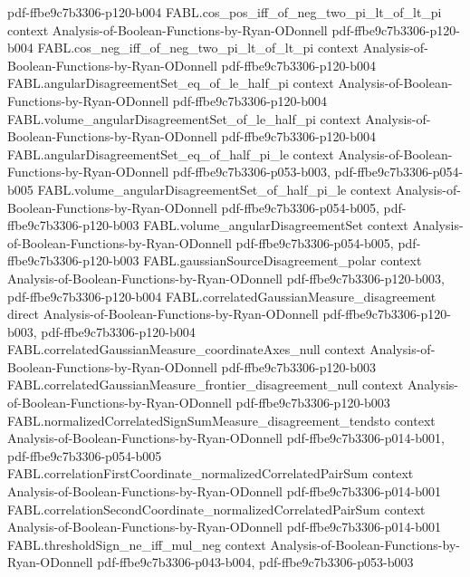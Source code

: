\begin{theorem}
  {pdf-ffbe9c7b3306-p120-b004}
\proofstep
  {FABL.cos_pos_iff_of_neg_two_pi_lt_of_lt_pi}
  {context}
  {Analysis-of-Boolean-Functions-by-Ryan-ODonnell}
  {pdf-ffbe9c7b3306-p120-b004}
\proofstep
  {FABL.cos_neg_iff_of_neg_two_pi_lt_of_lt_pi}
  {context}
  {Analysis-of-Boolean-Functions-by-Ryan-ODonnell}
  {pdf-ffbe9c7b3306-p120-b004}
\proofstep
  {FABL.angularDisagreementSet_eq_of_le_half_pi}
  {context}
  {Analysis-of-Boolean-Functions-by-Ryan-ODonnell}
  {pdf-ffbe9c7b3306-p120-b004}
\proofstep
  {FABL.volume_angularDisagreementSet_of_le_half_pi}
  {context}
  {Analysis-of-Boolean-Functions-by-Ryan-ODonnell}
  {pdf-ffbe9c7b3306-p120-b004}
\proofstep
  {FABL.angularDisagreementSet_eq_of_half_pi_le}
  {context}
  {Analysis-of-Boolean-Functions-by-Ryan-ODonnell}
  {pdf-ffbe9c7b3306-p053-b003,
    pdf-ffbe9c7b3306-p054-b005}
\proofstep
  {FABL.volume_angularDisagreementSet_of_half_pi_le}
  {context}
  {Analysis-of-Boolean-Functions-by-Ryan-ODonnell}
  {pdf-ffbe9c7b3306-p054-b005,
    pdf-ffbe9c7b3306-p120-b003}
\proofstep
  {FABL.volume_angularDisagreementSet}
  {context}
  {Analysis-of-Boolean-Functions-by-Ryan-ODonnell}
  {pdf-ffbe9c7b3306-p054-b005,
    pdf-ffbe9c7b3306-p120-b003}
\proofstep
  {FABL.gaussianSourceDisagreement_polar}
  {context}
  {Analysis-of-Boolean-Functions-by-Ryan-ODonnell}
  {pdf-ffbe9c7b3306-p120-b003,
    pdf-ffbe9c7b3306-p120-b004}
\proofstep
  {FABL.correlatedGaussianMeasure_disagreement}
  {direct}
  {Analysis-of-Boolean-Functions-by-Ryan-ODonnell}
  {pdf-ffbe9c7b3306-p120-b003,
    pdf-ffbe9c7b3306-p120-b004}
\proofstep
  {FABL.correlatedGaussianMeasure_coordinateAxes_null}
  {context}
  {Analysis-of-Boolean-Functions-by-Ryan-ODonnell}
  {pdf-ffbe9c7b3306-p120-b003}
\proofstep
  {FABL.correlatedGaussianMeasure_frontier_disagreement_null}
  {context}
  {Analysis-of-Boolean-Functions-by-Ryan-ODonnell}
  {pdf-ffbe9c7b3306-p120-b003}
\proofstep
  {FABL.normalizedCorrelatedSignSumMeasure_disagreement_tendsto}
  {context}
  {Analysis-of-Boolean-Functions-by-Ryan-ODonnell}
  {pdf-ffbe9c7b3306-p014-b001,
    pdf-ffbe9c7b3306-p054-b005}
\proofstep
  {FABL.correlationFirstCoordinate_normalizedCorrelatedPairSum}
  {context}
  {Analysis-of-Boolean-Functions-by-Ryan-ODonnell}
  {pdf-ffbe9c7b3306-p014-b001}
\proofstep
  {FABL.correlationSecondCoordinate_normalizedCorrelatedPairSum}
  {context}
  {Analysis-of-Boolean-Functions-by-Ryan-ODonnell}
  {pdf-ffbe9c7b3306-p014-b001}
\proofstep
  {FABL.thresholdSign_ne_iff_mul_neg}
  {context}
  {Analysis-of-Boolean-Functions-by-Ryan-ODonnell}
  {pdf-ffbe9c7b3306-p043-b004,
    pdf-ffbe9c7b3306-p053-b003}

\end{theorem}
